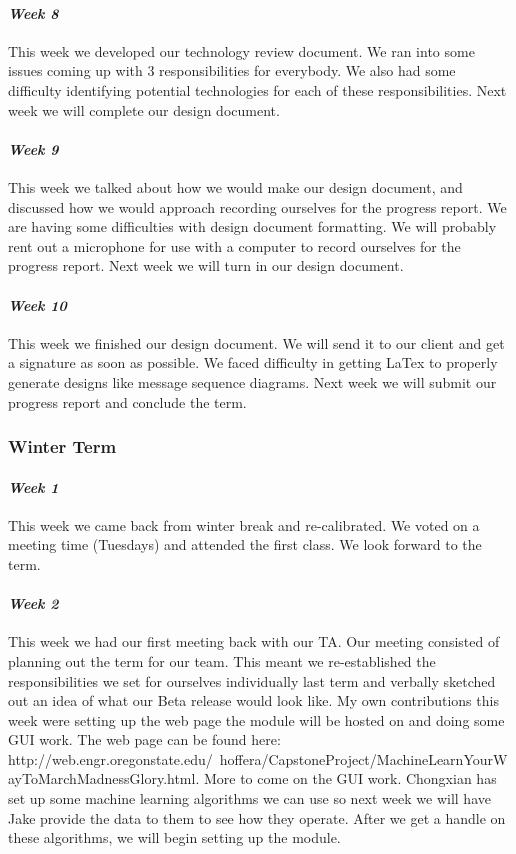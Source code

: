 \documentclass[onecolumn, draftclsnofoot,10pt, compsoc]{IEEEtran}
\begin{document}
\paragraph{\emph{Week 8}}
This week we developed our technology review document. We ran into some issues coming up with 3 responsibilities for everybody. We also had some difficulty identifying potential technologies for each of these responsibilities. Next week we will complete our design document.
\paragraph{\emph{Week 9}}
This week we talked about how we would make our design document, and discussed how we would approach recording ourselves for the progress report. We are having some difficulties with design document formatting. We will probably rent out a microphone for use with a computer to record ourselves for the progress report. Next week we will turn in our design document.
\paragraph{\emph{Week 10}}
This week we finished our design document. We will send it to our client and get a signature as soon as possible. We faced difficulty in getting LaTex to properly generate designs like message sequence diagrams. Next week we will submit our progress report and conclude the term.
\subsubsection{Winter Term}
\paragraph{\emph{Week 1}}
This week we came back from winter break and re-calibrated. We voted on a meeting time (Tuesdays) and attended the first class. We look forward to the term.
\paragraph{\emph{Week 2}}
This week we had our first meeting back with our TA. Our meeting consisted of planning out the term for our team. This meant we re-established the responsibilities we set for ourselves individually last term and verbally sketched out an idea of what our Beta release would look like. My own contributions this week were setting up the web page the module will be hosted on and doing some GUI work. The web page can be found here: http://web.engr.oregonstate.edu/~hoffera/CapstoneProject/MachineLearnYourWayToMarchMadnessGlory.html. More to come on the GUI work. Chongxian has set up some machine learning algorithms we can use so next week we will have Jake provide the data to them to see how they operate. After we get a handle on these algorithms, we will begin setting up the module.
\end{document}

